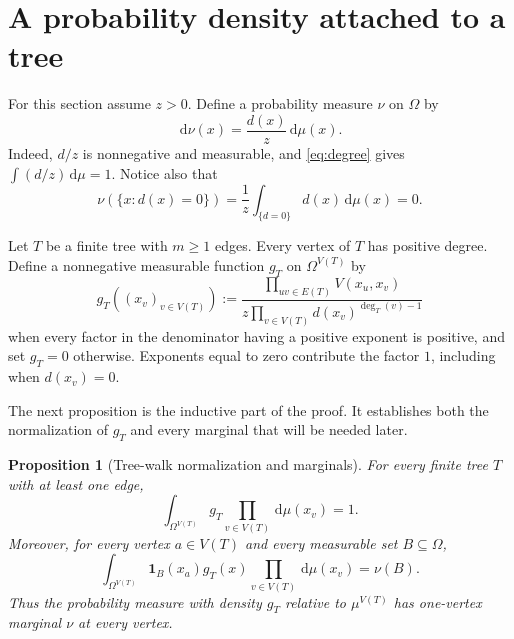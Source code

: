 \documentclass[11pt]{article}
\newtheorem{proposition}[theorem]{Proposition}
\newcommand{\dd}{\,\mathrm{d}}
\newcommand{\one}{\mathbf{1}}
\begin{document}
\section{A probability density attached to a tree}

For this section assume $z>0$.  Define a probability measure $\nu$ on
$\Omega$ by
\begin{equation}
\dd\nu(x)=\frac{d(x)}{z}\dd\mu(x).
\label{eq:nu}
\end{equation}
Indeed, $d/z$ is nonnegative and measurable, and
\eqref{eq:degree} gives $\int(d/z)\dd\mu=1$.  Notice also that
\begin{equation}
\nu(\{x:d(x)=0\})
=\frac1z\int_{\{d=0\}}d(x)\dd\mu(x)=0.
\label{eq:positive-degree-nu}
\end{equation}

Let $T$ be a finite tree with $m\geq1$ edges.  Every vertex of $T$ has
positive degree.  Define a nonnegative measurable function
$g_T$ on $\Omega^{V(T)}$ by
\begin{equation}
g_T((x_v)_{v\in V(T)})
:=
\frac{\displaystyle\prod_{uv\in E(T)}V(x_u,x_v)}
{\displaystyle z\prod_{v\in V(T)}d(x_v)^{\deg_T(v)-1}}
\label{eq:tree-density}
\end{equation}
when every factor in the denominator having a positive exponent is
positive, and set $g_T=0$ otherwise.  Exponents equal to zero contribute
the factor $1$, including when $d(x_v)=0$.

The next proposition is the inductive part of the proof.  It establishes
both the normalization of $g_T$ and every marginal that will be needed
later.

\begin{proposition}[Tree-walk normalization and marginals]
\label{prop:tree-density}
For every finite tree $T$ with at least one edge,
\begin{equation}
\int_{\Omega^{V(T)}}g_T\prod_{v\in V(T)}\dd\mu(x_v)=1.
\label{eq:normalization}
\end{equation}
Moreover, for every vertex $a\in V(T)$ and every measurable set
$B\subseteq\Omega$,
\begin{equation}
\int_{\Omega^{V(T)}}
\one_B(x_a)g_T(x)
\prod_{v\in V(T)}\dd\mu(x_v)
=\nu(B).
\label{eq:marginal}
\end{equation}
Thus the probability measure with density $g_T$ relative to
$\mu^{V(T)}$ has one-vertex marginal $\nu$ at every vertex.
\end{proposition}
\end{document}
